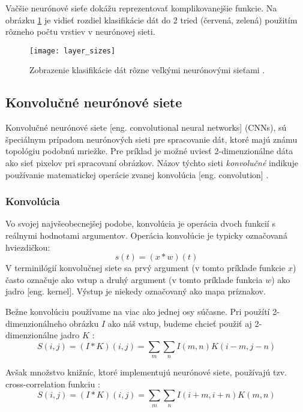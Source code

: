 Vačšie neurónové sieťe dokážu reprezentovať komplikovanejšie funkcie.
Na obrázku \ref{pic:XNNLayerExample} je vidieť rozdiel klasifikácie dát do 2 tried (červená, zelená) použitím rôzneho počtu vrstiev v neurónovej sieti.
\begin{figure}[H]
	\centering
	\texttt{[image: layer\_sizes]}
	\caption{Zobrazenie klasifikácie dát rôzne veľkými neurónovými sieťami \cite{odkaz:ConvolutionalNeuralNetworkCS231n}.}
	\label{pic:XNNLayerExample}
\end{figure}

\subsection{Konvolučné neurónové siete}
\label{subsec:convolutionalneuralnetwork}
Konvolučné neurónové siete [eng. convolutional neural networks] (CNNs), sú špeciálnym prípadom neurónových sieti pre spracovanie
    dát, ktoré majú známu topológiu podobnú mriežke.
Pre príklad je možné uviesť 2-dimenzionálne dáta ako sieť pixelov pri spracovaní obrázkov.
Názov týchto sieti \textit{konvolučné} indikuje používanie matematickej operácie zvanej konvolúcia [eng. convolution] \cite{book:Goodfellow-et-al-2016}.

\subsubsection{Konvolúcia}
Vo svojej najvšeobecnejšej podobe, konvolúcia je operácia dvoch funkcií s reálnymi hodnotami argumentov.
Operácia konvolúcie je typicky označovaná hviezdičkou:
\begin{equation}
    s(t) = (x * w)(t)
\end{equation}
V terminilógií konvolučnej siete sa prvý argument (v tomto príklade funkcie $x$) často označuje ako vstup a druhý
    argument (v tomto príklade funkcia $w$) ako jadro [eng. kernel]. Výstup je niekedy označovaný ako mapa príznakov.

Bežne konvolúciu používame na viac ako jednej osy súčasne.
Pri použítí 2-dimenzionálneho obrázku $I$ ako náš vstup, budeme chcieť použiť aj 2-dimenzionálne jadro $K$ \cite{book:Goodfellow-et-al-2016}:
\begin{equation}
    S(i,j) = (I * K)(i, j) = \sum_m \sum_n I(m,n) K(i - m, j - n)
\end{equation}

Avšak množstvo knižníc, ktoré implementujú neurónové siete, používajú tzv. cross-correlation funkciu \cite{book:Goodfellow-et-al-2016}:
\begin{equation}
    S(i,j) = (I * K)(i, j) = \sum_m \sum_n I(i + m, i + n) K(m, n)
\end{equation}

